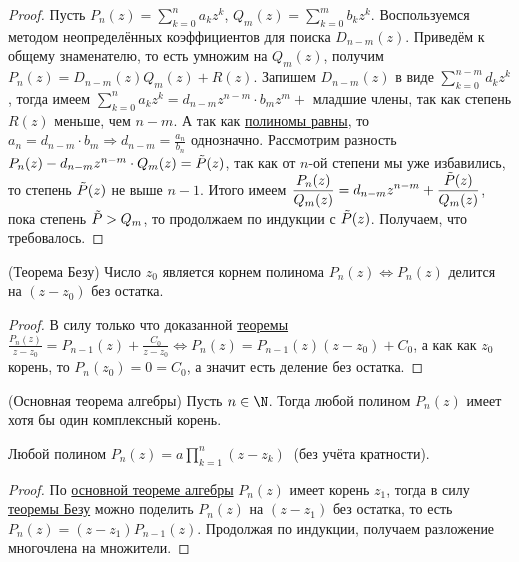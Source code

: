 \begin{proof}
    Пусть $\displaystyle P_{n} (z) = \sum_{k = 0}^{n} a_{k} z^{k}$, $\displaystyle Q_{m} (z) = \sum_{k = 0}^{m} b_{k} z^{k}$. Воспользуемся методом неопределённых коэффициентов для поиска $D_{n - m} (z)$. Приведём к общему знаменателю, то есть умножим на $Q_{m} (z)$, получим $P_{n} (z) = D_{n - m} (z) Q_{m} (z) + R (z)$. Запишем $D_{n - m} (z)$ в виде $\displaystyle \sum_{k = 0}^{n - m} d_{k} z^{k}$, тогда имеем $\displaystyle \sum_{k = 0}^{n} a_{k} z^{k} = d_{n - m} z^{n - m} \cdot b_{m} z^{m} +$ младшие члены, так как степень $R (z)$ меньше, чем $n - m$. А так как \hyperlink{prop6.1}{полиномы равны}, то $\displaystyle a_{n} = d_{n - m} \cdot b_{m} \Rightarrow d_{n - m} = \frac{a_{n}}{b_{n}}$ однозначно. Рассмотрим разность $P_{n} (z) - d_{n - m} z^{n - m} \cdot Q_{m} (z) = \Tilde{P} (z)$, так как от $n$-ой степени мы уже избавились, то степень $\Tilde{P} (z)$ не выше $n - 1$. Итого имеем $\displaystyle \frac{P_{n} (z)}{Q_{m} (z)} = d_{n - m} z^{n - m} + \frac{\Tilde{P} (z)}{Q_{m} (z)}$, пока степень $\Tilde{P} > Q_{m}$, то продолжаем по индукции с $\Tilde{P} (z)$. Получаем, что требовалось.
\end{proof}
\begin{theorem}
    \hypertarget{thm6.5}{(Теорема Безу) Число $z_{0}$ является корнем полинома $P_{n} (z) \Leftrightarrow P_{n} (z)$ делится на $(z - z_{0})$ без остатка.}
\end{theorem}
\begin{proof}
    В силу только что доказанной \hyperlink{thm6.4}{теоремы} $\displaystyle \frac{P_{n} (z)}{z - z_{0}} = P_{n - 1} (z) + \frac{C_{0}}{z - z_{0}} \Leftrightarrow P_{n} (z) = P_{n - 1} (z) (z - z_{0}) + C_{0}$, а как как $z_{0}$ корень, то $P_{n} (z_{0}) = 0 = C_{0}$, а значит есть деление без остатка.
\end{proof}
\begin{theorem}
    \hypertarget{thm6.6}{(Основная теорема алгебры) Пусть $n \in \N$. Тогда любой полином $P_{n} (z)$ имеет хотя бы один комплексный корень.}
\end{theorem}
\begin{corollary}
    Любой полином $\displaystyle P_{n} (z) = a \prod_{k = 1}^{n} (z - z_{k}) \ $ (без учёта кратности).
\end{corollary}
\begin{proof}
    По \hyperlink{thm6.6}{основной теореме алгебры} $P_{n} (z)$ имеет корень $z_{1}$, тогда в силу \hyperlink{thm6.5}{теоремы Безу} можно поделить $P_{n} (z)$ на $(z - z_{1})$ без остатка, то есть $P_{n} (z) = (z - z_{1}) P_{n - 1} (z)$. Продолжая по индукции, получаем разложение многочлена на множители.
\end{proof}